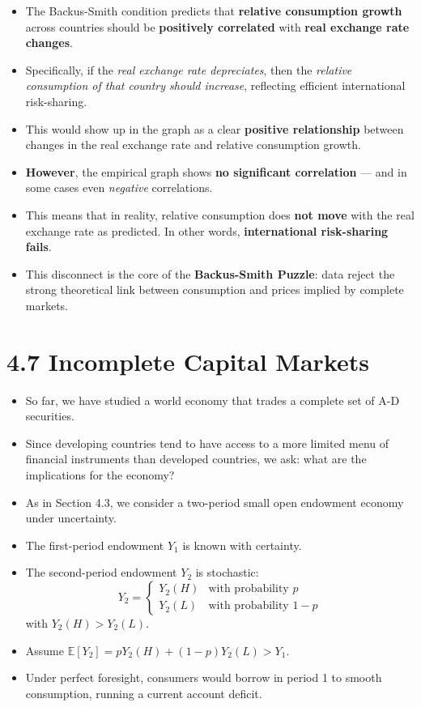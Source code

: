 \documentclass[12pt]{article}
\begin{document}
\begin{itemize}
    \item The Backus-Smith condition predicts that \textbf{relative consumption growth} across countries should be \textbf{positively correlated} with \textbf{real exchange rate changes}.
    
    \item Specifically, if the \textit{real exchange rate depreciates}, then the \textit{relative consumption of that country should increase}, reflecting efficient international risk-sharing.

    \item This would show up in the graph as a clear \textbf{positive relationship} between changes in the real exchange rate and relative consumption growth.

    \item \textbf{However}, the empirical graph shows \textbf{no significant correlation} --- and in some cases even \textit{negative} correlations.

    \item This means that in reality, relative consumption does \textbf{not move} with the real exchange rate as predicted. In other words, \textbf{international risk-sharing fails}.

    \item This disconnect is the core of the \textbf{Backus-Smith Puzzle}: data reject the strong theoretical link between consumption and prices implied by complete markets.
\end{itemize}

\section*{\noindent\textbf{4.7 Incomplete Capital Markets}}

\begin{itemize}
    \item So far, we have studied a world economy that trades a complete set of A-D securities.
    \item Since developing countries tend to have access to a more limited menu of financial instruments than developed countries, we ask: what are the implications for the economy?
    \item As in Section 4.3, we consider a two-period small open endowment economy under uncertainty.
    \item The first-period endowment $Y_1$ is known with certainty.
    \item The second-period endowment $Y_2$ is stochastic:
    \[
    Y_2 = 
    \begin{cases}
    Y_2(H) & \text{with probability } p \\
    Y_2(L) & \text{with probability } 1 - p
    \end{cases}
    \]
    with $Y_2(H) > Y_2(L)$.
    \item Assume $\mathbb{E}[Y_2] = pY_2(H) + (1-p)Y_2(L) > Y_1$.
    \item Under perfect foresight, consumers would borrow in period 1 to smooth consumption, running a current account deficit.
\end{itemize}
\end{document}
